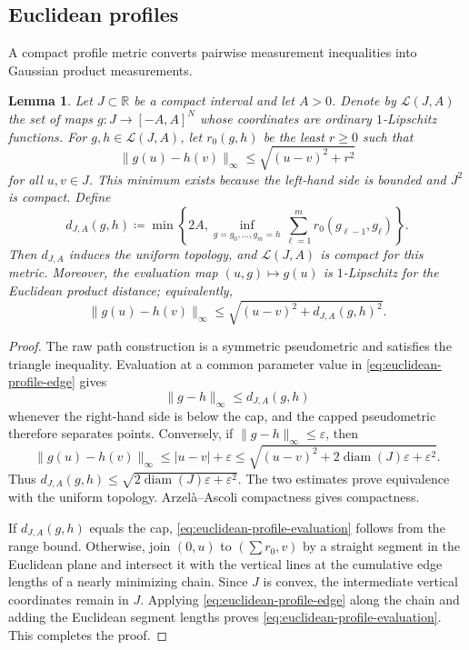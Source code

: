 \documentclass{amsart}
\numberwithin{equation}{section}
\theoremstyle{plain}
\newtheorem{lemma}[theorem]{Lemma}
\theoremstyle{definition}
\theoremstyle{remark}
\newcommand{\R}{\mathbb R}
\newcommand{\eps}{\varepsilon}
\begin{document}
\subsection{Euclidean profiles}

A compact profile metric converts pairwise measurement inequalities into Gaussian product measurements.

\begin{lemma}\label{lem:euclidean-profile-metric}
Let $J\subset\R$ be a compact interval and let $A>0$.  Denote by $\mathscr L(J,A)$ the set of maps
$g\colon J\to[-A,A]^N$ whose coordinates are ordinary $1$-Lipschitz functions.  For $g,h\in\mathscr L(J,A)$, let
$r_0(g,h)$ be the least $r\ge0$ such that
\begin{equation}\label{eq:euclidean-profile-edge}
 \lVert g(u)-h(v)\rVert_\infty\le\sqrt{(u-v)^2+r^2}
\end{equation}
for all $u,v\in J$.  This minimum exists because the left-hand side is bounded and $J^2$ is compact.  Define
\begin{equation}\label{eq:euclidean-profile-path}
 d_{J,A}(g,h) \coloneqq
 \min\left\{2A, \inf_{g=g_0,\ldots,g_m=h}\sum_{\ell=1}^m r_0(g_{\ell-1},g_\ell)\right\}.
\end{equation}
Then $d_{J,A}$ induces the uniform topology, and $\mathscr L(J,A)$ is compact for this metric.  Moreover, the evaluation
map $(u,g)\mapsto g(u)$ is $1$-Lipschitz for the Euclidean product distance; equivalently,
\begin{equation}\label{eq:euclidean-profile-evaluation}
 \lVert g(u)-h(v)\rVert_\infty \le\sqrt{(u-v)^2+d_{J,A}(g,h)^2}.
\end{equation}
\end{lemma}

\begin{proof}
The raw path construction is a symmetric pseudometric and satisfies the triangle inequality.  Evaluation at a common parameter value in \eqref{eq:euclidean-profile-edge} gives
\[ \lVert g-h\rVert_\infty\le d_{J,A}(g,h) \]
whenever the right-hand side is below the cap, and the capped pseudometric therefore separates points.  Conversely, if $\lVert g-h\rVert_\infty\le\eps$, then
\[ \lVert g(u)-h(v)\rVert_\infty\le|u-v|+\eps
 \le\sqrt{(u-v)^2+2\operatorname{diam}(J)\eps+\eps^2}. \]
Thus $d_{J,A}(g,h)\le\sqrt{2\operatorname{diam}(J)\eps+\eps^2}$.  The two estimates prove equivalence with the uniform
topology.  Arzel\`a--Ascoli compactness gives compactness.

If $d_{J,A}(g,h)$ equals the cap, \eqref{eq:euclidean-profile-evaluation} follows from the range bound.  Otherwise, join
$(0,u)$ to $(\sum r_0,v)$ by a straight segment in the Euclidean plane and intersect it with the vertical lines at the
cumulative edge lengths of a nearly minimizing chain.  Since $J$ is convex, the intermediate vertical coordinates remain
in $J$.  Applying \eqref{eq:euclidean-profile-edge} along the chain and adding the Euclidean segment lengths proves
\eqref{eq:euclidean-profile-evaluation}.  This completes the proof.
\end{proof}
\end{document}
